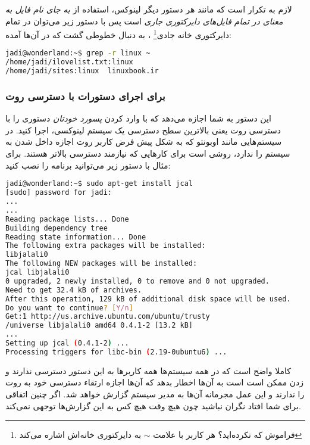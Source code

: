 لازم به تکرار است که مانند هر دستور دیگر لینوکس، استفاده از
\emph{ به جای نام فایل به معنای در تمام فایل‌های دایرکتوری جاری}
است پس با دستور زیر می‌توان در تمام
دایرکتوری خانه جادی\footnote{فراموش که نکرده‌اید؟ هر کاربر با علامت $\sim$ به دایرکتوری خانه‌اش اشاره می‌کند}
، به دنبال خطوطی گشت که 
 در آن‌ها آمده:

\begin{latin}
\begin{lstlisting}[language=bash,basicstyle=\ttfamily,linewidth=12cm]
jadi@wonderland:~$ grep -r linux ~
/home/jadi/ilovelist.txt:linux
/home/jadi/sites:linux  linuxbook.ir
\end{lstlisting}
\end{latin}

\subsubsection*{
 برای اجرای دستورات با دسترسی روت}
این دستور به شما اجازه می‌دهد که با وارد کردن
\emph{پسورد خودتان}
دستوری را با دسترسی روت یعنی بالاترین سطح دسترسی یک سیستم لینوکسی، اجرا کنید. در سیستم‌هایی مانند اوبونتو که به شکل پیش فرض کاربر روت اجازه داخل شدن به سیستم را ندارد، 
 روشی است برای کارهایی که نیازمند دسترسی بالاتر هستند. برای مثال با دستور زیر می‌توانید برنامه 
 را نصب کنید:

\begin{latin}
\begin{lstlisting}[language=bash,basicstyle=\ttfamily,linewidth=10cm]
jadi@wonderland:~$ sudo apt-get install jcal
[sudo] password for jadi: 
...
...
Reading package lists... Done
Building dependency tree       
Reading state information... Done
The following extra packages will be installed:
libjalali0
The following NEW packages will be installed:
jcal libjalali0
0 upgraded, 2 newly installed, 0 to remove and 0 not upgraded.
Need to get 32.4 kB of archives.
After this operation, 129 kB of additional disk space will be used.
Do you want to continue? [Y/n] 
Get:1 http://us.archive.ubuntu.com/ubuntu/trusty
/universe libjalali0 amd64 0.4.1-2 [13.2 kB]
...
Setting up jcal (0.4.1-2) ...
Processing triggers for libc-bin (2.19-0ubuntu6) ...
\end{lstlisting}
\end{latin}

کاملا واضح است که در همه سیستم‌ها همه کاربرها به این دستور دسترسی ندارند و زدن 
 ممکن است است به آن‌ها اخطار بدهد که آن‌ها اجازه ارتقاء دسترسی خود به روت را ندارند و این عمل مجرمانه آن‌ها به مدیر سیستم گزارش خواهد شد. اگر چنین اتفاقی برای شما افتاد نگران نباشید چون هیچ ‌وقت هیچ کس به این گزارش‌ها توجهی نمی‌کند.
